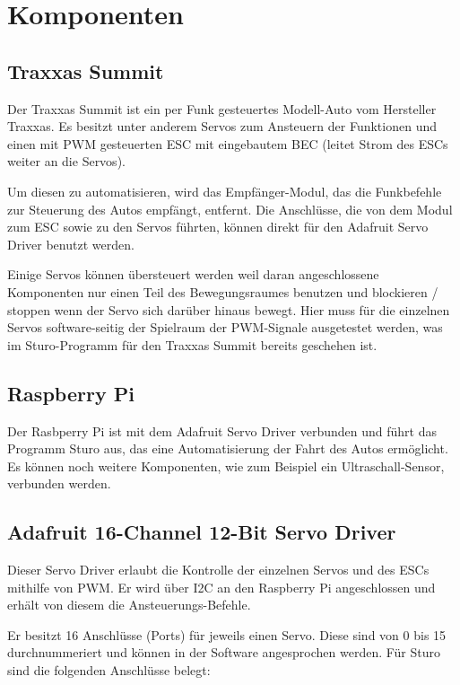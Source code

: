\documentclass[a4paper,10pt]{scrartcl}
\begin{document}
\section{Komponenten}

  \subsection{Traxxas Summit}

    Der Traxxas Summit ist ein per Funk gesteuertes Modell-Auto vom Hersteller Traxxas.
    Es besitzt unter anderem Servos zum Ansteuern der Funktionen und einen mit PWM gesteuerten ESC
    mit eingebautem BEC (leitet Strom des ESCs weiter an die Servos).

    Um diesen zu automatisieren, wird das Empfänger-Modul, das die Funkbefehle zur Steuerung des
    Autos empfängt, entfernt.
    Die Anschlüsse, die von dem Modul zum ESC sowie zu den Servos führten, können direkt für den
    Adafruit Servo Driver benutzt werden.

    Einige Servos können übersteuert werden weil daran angeschlossene Komponenten nur einen Teil
    des Bewegungsraumes benutzen und blockieren / stoppen wenn der Servo sich darüber hinaus
    bewegt.
    Hier muss für die einzelnen Servos software-seitig der Spielraum der PWM-Signale ausgetestet
    werden, was im Sturo-Programm für den Traxxas Summit bereits geschehen ist.

  \subsection{Raspberry Pi}

    Der Rasbperry Pi ist mit dem Adafruit Servo Driver verbunden und führt das Programm Sturo aus,
    das eine Automatisierung der Fahrt des Autos ermöglicht.
    Es können noch weitere Komponenten, wie zum Beispiel ein Ultraschall-Sensor, verbunden werden.

  \subsection{Adafruit 16-Channel 12-Bit Servo Driver}

    Dieser Servo Driver \cite{adafruitmod} erlaubt die Kontrolle der einzelnen
    Servos und des ESCs mithilfe von PWM.
    Er wird über I2C an den Raspberry Pi angeschlossen und erhält von diesem die
    Ansteuerungs-Befehle.

    Er besitzt 16 Anschlüsse (Ports) für jeweils einen Servo.
    Diese sind von 0 bis 15 durchnummeriert und können in der Software angesprochen werden.
    Für Sturo sind die folgenden Anschlüsse belegt:
\end{document}
